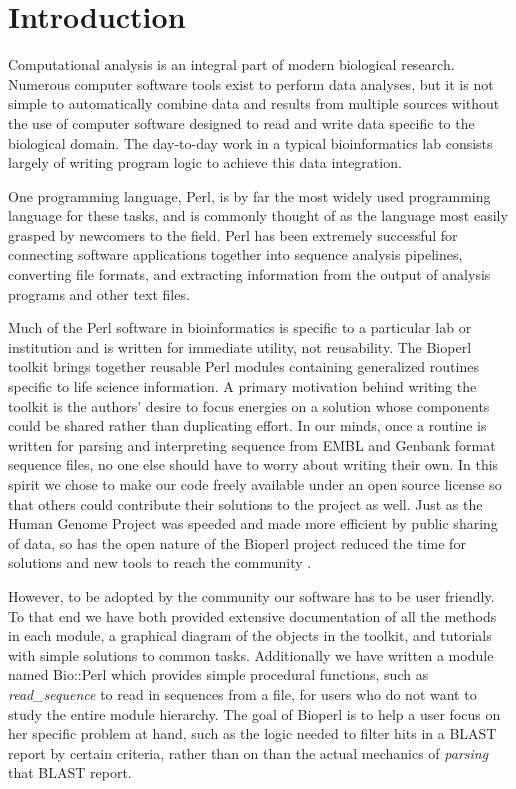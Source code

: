 \documentclass[12pt]{article}
\begin{document}
\section{Introduction}

Computational analysis is an integral part of modern biological
research.  Numerous computer software tools exist to perform data
analyses, but it is not simple to automatically combine data and
results from multiple sources without the use of computer software
designed to read and write data specific to the biological domain.
The day-to-day work in a typical bioinformatics lab consists largely
of writing program logic to achieve this data integration.

One programming language, Perl, is by far the most widely used
programming language for these tasks, and is commonly thought of as
the language most easily grasped by newcomers to the field.  Perl has
been extremely successful for connecting software applications together into
sequence analysis pipelines, converting file formats, and extracting
information from the output of analysis programs and other text files.

Much of the Perl software in bioinformatics is specific to a
particular lab or institution and is written for immediate
utility, not reusability.  The Bioperl toolkit brings together
reusable Perl modules containing generalized routines specific to life
science information.  A primary motivation behind writing the toolkit
is the authors' desire to focus energies on a solution whose
components could be shared rather than duplicating effort.  In our
minds, once a routine is written for parsing and interpreting sequence
from EMBL and Genbank format sequence files, no one else should have
to worry about writing their own.  In this spirit we chose to make our
code freely available under an open source license
\cite{open-source-ref} so that others could contribute their solutions
to the project as well.  Just as the Human Genome Project was speeded
and made more efficient by public sharing of data, so has the open
nature of the Bioperl project reduced the time for solutions and new
tools to reach the community \cite{waterston}.

However, to be adopted by the community our software has to be user
friendly.  To that end we have both provided extensive documentation
of all the methods in each module, a graphical diagram of the objects
in the toolkit, and tutorials with simple solutions to common tasks.
Additionally we have written a module named Bio::Perl which provides
simple procedural functions, such as \textit{read\_sequence} to read
in sequences from a file, for users who do not want to study the
entire module hierarchy.  The goal of Bioperl is to help a user focus
on her specific problem at hand, such as the logic needed to filter
hits in a BLAST \cite{blast} report by certain criteria, rather than
on than the actual mechanics of \textit{parsing} that BLAST report.
\end{document}
